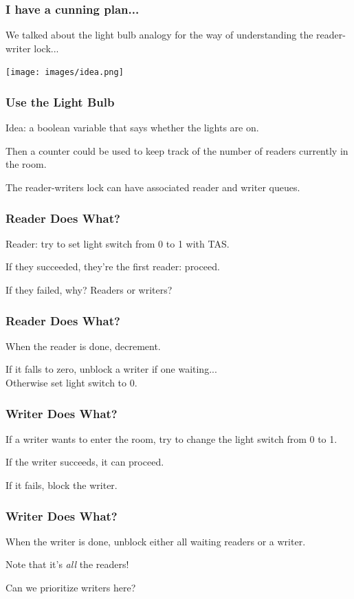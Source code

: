 \begin{frame}
\frametitle{I have a cunning plan...}

We talked about the light bulb analogy for the way of understanding the reader-writer lock...

\begin{center}
	\texttt{[image: images/idea.png]}
\end{center}

\end{frame}

\begin{frame}
\frametitle{Use the Light Bulb}

Idea: a boolean variable that says whether the lights are on. 

Then a counter could be used to keep track of the number of readers currently in the room. 

The reader-writers lock can have associated reader and writer queues. 

\end{frame}

\begin{frame}
\frametitle{Reader Does What?}

Reader: try to set light switch from 0 to 1 with TAS.

If they succeeded, they're the first reader: proceed.

If they failed, why? Readers or writers?

\end{frame}

\begin{frame}
\frametitle{Reader Does What?}

When the reader is done, decrement.

If it falls to zero, unblock a writer if one waiting...\\
\quad Otherwise set light switch to 0.

\end{frame}

\begin{frame}
\frametitle{Writer Does What?}

If a writer wants to enter the room, try to change the light switch from 0 to 1. 

If the writer succeeds, it can proceed. 

If it fails, block the writer. 

\end{frame}

\begin{frame}
\frametitle{Writer Does What?}

When the writer is done, unblock either all waiting readers or a writer. 


Note that it's \textit{all} the readers!

Can we prioritize writers here?

\end{frame}

